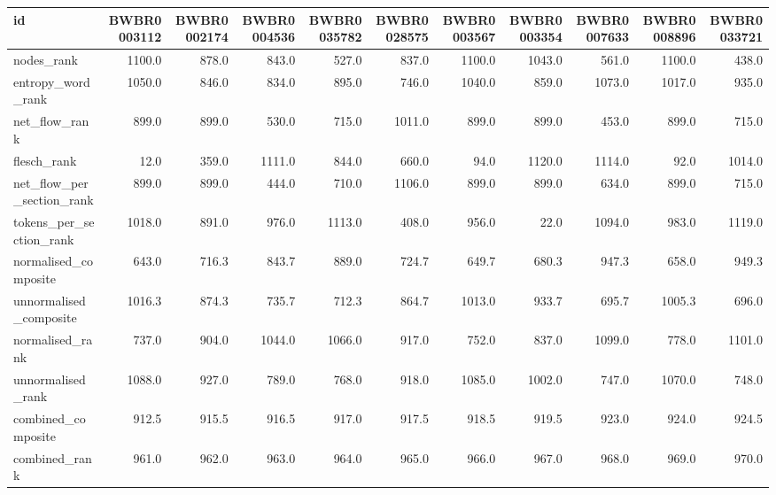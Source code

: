 \begin{tabular}{lrrrrrrrrrr}
\toprule
id & BWBR0003112 & BWBR0002174 & BWBR0004536 & BWBR0035782 & BWBR0028575 & BWBR0003567 & BWBR0003354 & BWBR0007633 & BWBR0008896 & BWBR0033721 \\
\midrule
nodes\_rank & 1100.0 & 878.0 & 843.0 & 527.0 & 837.0 & 1100.0 & 1043.0 & 561.0 & 1100.0 & 438.0 \\
\cline{1-11}
entropy\_word\_rank & 1050.0 & 846.0 & 834.0 & 895.0 & 746.0 & 1040.0 & 859.0 & 1073.0 & 1017.0 & 935.0 \\
\cline{1-11}
net\_flow\_rank & 899.0 & 899.0 & 530.0 & 715.0 & 1011.0 & 899.0 & 899.0 & 453.0 & 899.0 & 715.0 \\
\cline{1-11}
flesch\_rank & 12.0 & 359.0 & 1111.0 & 844.0 & 660.0 & 94.0 & 1120.0 & 1114.0 & 92.0 & 1014.0 \\
\cline{1-11}
net\_flow\_per\_section\_rank & 899.0 & 899.0 & 444.0 & 710.0 & 1106.0 & 899.0 & 899.0 & 634.0 & 899.0 & 715.0 \\
\cline{1-11}
tokens\_per\_section\_rank & 1018.0 & 891.0 & 976.0 & 1113.0 & 408.0 & 956.0 & 22.0 & 1094.0 & 983.0 & 1119.0 \\
\cline{1-11}
normalised\_composite & 643.0 & 716.3 & 843.7 & 889.0 & 724.7 & 649.7 & 680.3 & 947.3 & 658.0 & 949.3 \\
\cline{1-11}
unnormalised\_composite & 1016.3 & 874.3 & 735.7 & 712.3 & 864.7 & 1013.0 & 933.7 & 695.7 & 1005.3 & 696.0 \\
\cline{1-11}
normalised\_rank & 737.0 & 904.0 & 1044.0 & 1066.0 & 917.0 & 752.0 & 837.0 & 1099.0 & 778.0 & 1101.0 \\
\cline{1-11}
unnormalised\_rank & 1088.0 & 927.0 & 789.0 & 768.0 & 918.0 & 1085.0 & 1002.0 & 747.0 & 1070.0 & 748.0 \\
\cline{1-11}
combined\_composite & 912.5 & 915.5 & 916.5 & 917.0 & 917.5 & 918.5 & 919.5 & 923.0 & 924.0 & 924.5 \\
\cline{1-11}
combined\_rank & 961.0 & 962.0 & 963.0 & 964.0 & 965.0 & 966.0 & 967.0 & 968.0 & 969.0 & 970.0 \\
\cline{1-11}
\bottomrule
\end{tabular}

